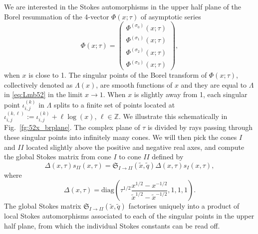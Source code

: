 \documentclass[12pt,reqno]{amsart}
\theoremstyle{definition}
\def\IZ{\mathbb{Z}}
\def\s{\sigma}
\def\tq{\tilde{q}}
\def\tx{\tilde{x}}
\def\tx{\tilde{x}}
\def\diag{\mathrm{diag}}
\def\mf{\mathfrak}
\def\IZ{\mathbb{Z}}
\begin{document}
We are interested in the Stokes automorphisms in the upper half plane
of the Borel resummation of the 4-vector $\Phi(x;\tau)$ of asymptotic
series
\begin{equation}
  \Phi(x;\tau) =
  \begin{pmatrix}
    \Phi^{(\s_0)}(x;\tau)\\
    \Phi^{(\s_1)}(x;\tau)\\
    \Phi^{(\s_2)}(x;\tau)\\
    \Phi^{(\s_3)}(x;\tau)
  \end{pmatrix},
\end{equation}
when $x$ is close to 1.  The singular points of the Borel transform of
$\Phi(x;\tau)$, collectively denoted as $\Lambda(x)$, are smooth
functions of $x$ and they are equal to $\Lambda$ in \eqref{eq:Lmb52}
in the limit $x\rightarrow 1$.  When $x$ is slightly away from 1, each
singular point $\iota_{i,j}^{(k)}$ in $\Lambda$ splits to a finite set
of points located at
$\iota_{i,j}^{(k,\ell)}:=\iota_{i,j}^{(k)}+\ell \log(x)$,
$\ell\in\IZ$.  We illustrate this schematically in
Fig.~\ref{fg:52x_brplane}.  The complex plane of $\tau$ is divided by
rays passing through these singular points into infinitely many cones.
We will then pick the cones $I$ and $II$ located slightly above the
positive and negative real axes, and compute the global Stokes matrix
from cone $I$ to cone $II$ defined by
%
\begin{equation}
  \Delta(x,\tau) s_{II}(x,\tau) = \mf{S}_{I\rightarrow II}(\tx,\tq)
  \Delta(x,\tau) s_{I}(x,\tau),
  \label{eq:SRRx}
\end{equation}
where
\begin{equation}
  \Delta(x,\tau) =
  \diag\left(\tau^{1/2}\frac{x^{1/2}-x^{-1/2}}{\tx^{1/2}-\tx^{-1/2}},1,1,1\right).
\end{equation}
The global Stokes matrix $\mf{S}_{I\rightarrow II}(\tx,\tq)$
factorises uniquely into a product of local Stokes automorphisms
associated to each of the singular points in the upper half plane, from
which the individual Stokes constants can be read off.
\end{document}
